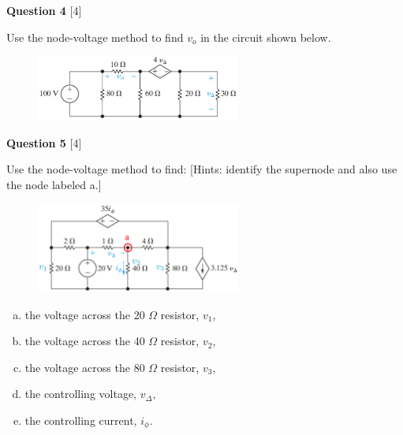 \documentclass[12pt]{article}
\begin{document}
\newpage
{\bf Question 4} [4] %

Use the node-voltage method to find $v_{o}$ in the circuit shown below.

\begin{figure}[h!]
\begin{center}
 \includegraphics[clip,width=0.6\textwidth]{Fig4-28.png}
\end{center}
\end{figure}

{\bf Question 5} [4] %

Use the node-voltage method to find: [Hints: identify the supernode and also use the node labeled {\color{red} a}.]

\begin{figure}[h!]
\begin{center}
 \includegraphics[clip,width=0.6\textwidth]{Fig4-29.png}
\end{center}
\end{figure}

\begin{enumerate}[(a)]
\item the voltage across the 20 $\Omega$ resistor, $v_{1}$, 
\item the voltage across the 40 $\Omega$ resistor, $v_{2}$, 
\item the voltage across the 80 $\Omega$ resistor, $v_{3}$, 
\item the controlling voltage, $v_{\Delta}$, 
\item the controlling current, $i_{\phi}$. 
\end{enumerate}
 
\end{document}
